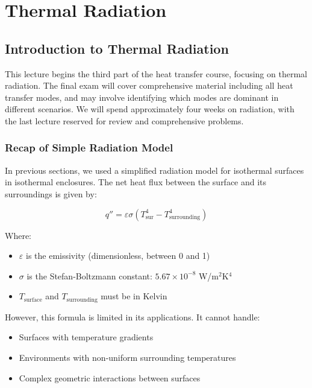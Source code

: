 \section*{Thermal Radiation}

\subsection*{Introduction to Thermal Radiation}

This lecture begins the third part of the heat transfer course, focusing on thermal radiation. The final exam will cover comprehensive material including all heat transfer modes, and may involve identifying which modes are dominant in different scenarios. We will spend approximately four weeks on radiation, with the last lecture reserved for review and comprehensive problems.
\subsubsection*{Recap of Simple Radiation Model}
In previous sections, we used a simplified radiation model for isothermal surfaces in isothermal enclosures. The net heat flux between the surface and its surroundings is given by:

\[
    q'' = \varepsilon \sigma (T_{\text{sur}}^4 - T_{\text{surrounding}}^4)
\]

Where:
\begin{itemize}
    \item $\varepsilon$ is the emissivity (dimensionless, between 0 and 1)
    \item $\sigma$ is the Stefan-Boltzmann constant: $5.67 \times 10^{-8}$ W/m$^2$K$^4$
    \item $T_{\text{surface}}$ and $T_{\text{surrounding}}$ must be in Kelvin
\end{itemize}

However, this formula is limited in its applications. It cannot handle:
\begin{itemize}
    \item Surfaces with temperature gradients
    \item Environments with non-uniform surrounding temperatures
    \item Complex geometric interactions between surfaces
\end{itemize}

